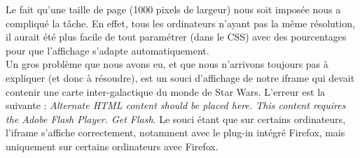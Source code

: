 
Le fait qu'une taille de page (1000 pixels de largeur) nous soit imposée nous a compliqué la tâche.
En effet, tous les ordinateurs n'ayant pas la même résolution, il aurait été plus facile de tout paramétrer (dans le CSS) avec des pourcentages pour que l'affichage s'adapte automatiquement.\\

Un gros problème que nous avons eu, et que nous n'arrivons toujours pas à expliquer (et donc à résoudre), est un souci d'affichage de notre iframe qui devait contenir une carte inter-galactique du monde de Star Wars.
L'erreur est la suivante : \textit{Alternate HTML content should be placed here. This content requires the Adobe Flash Player. Get Flash}.
Le souci étant que sur certains ordinateurs, l'iframe s'affiche correctement, notamment avec le plug-in intégré Firefox, mais uniquement sur certains ordinateurs avec Firefox.
